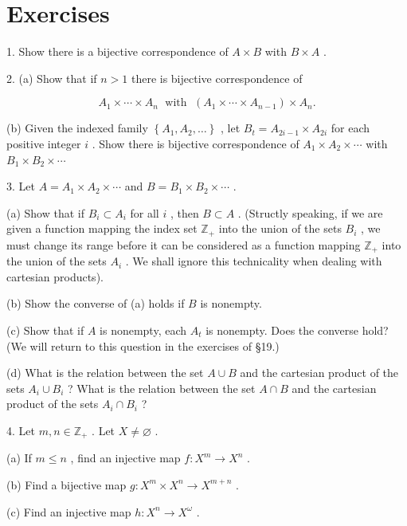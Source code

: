 \section*{Exercises}

1. Show there is a bijective correspondence of \(A \times  B\) with \(B \times  A\) .

2. (a) Show that if \(n > 1\) there is bijective correspondence of

\[
{A}_{1} \times  \cdots  \times  {A}_{n}\;\text{ with }\;\left( {{A}_{1} \times  \cdots  \times  {A}_{n - 1}}\right)  \times  {A}_{n}.
\]

(b) Given the indexed family \(\left\{  {{A}_{1},{A}_{2},\ldots }\right\}\) , let \({B}_{t} = {A}_{{2i} - 1} \times  {A}_{2i}\) for each positive integer \(i\) . Show there is bijective correspondence of \({A}_{1} \times  {A}_{2} \times  \cdots\) with \({B}_{1} \times  {B}_{2} \times  \cdots\)

3. Let \(A = {A}_{1} \times  {A}_{2} \times  \cdots\) and \(B = {B}_{1} \times  {B}_{2} \times  \cdots\) .

(a) Show that if \({B}_{i} \subset  {A}_{i}\) for all \(i\) , then \(B \subset  A\) . (Structly speaking, if we are given a function mapping the index set \({\mathbb{Z}}_{ + }\) into the union of the sets \({B}_{i}\) , we must change its range before it can be considered as a function mapping \({\mathbb{Z}}_{ + }\) into the union of the sets \({A}_{i}\) . We shall ignore this technicality when dealing with cartesian products).

(b) Show the converse of (a) holds if \(B\) is nonempty.

(c) Show that if \(A\) is nonempty, each \({A}_{t}\) is nonempty. Does the converse hold? (We will return to this question in the exercises of §19.)

(d) What is the relation between the set \(A \cup  B\) and the cartesian product of the sets \({A}_{i} \cup  {B}_{i}\) ? What is the relation between the set \(A \cap  B\) and the cartesian product of the sets \({A}_{i} \cap  {B}_{i}\) ?

4. Let \(m,n \in  {\mathbb{Z}}_{ + }\) . Let \(X \neq  \varnothing\) .

(a) If \(m \leq  n\) , find an injective map \(f : {X}^{m} \rightarrow  {X}^{n}\) .

(b) Find a bijective map \(g : {X}^{m} \times  {X}^{n} \rightarrow  {X}^{m + n}\) .

(c) Find an injective map \(h : {X}^{n} \rightarrow  {X}^{\omega }\) .

